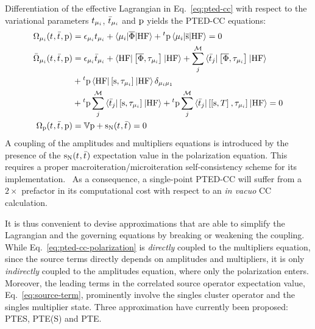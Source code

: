 Differentiation of the effective Lagrangian in Eq.~\eqref{eq:pted-cc}
with respect to the variational parameters $t_{\mu_i}$,
$\bar{t}_{\mu_i}$ and $\mathrm{p}$ yields the \acs{PTED}-\acs{CC}
equations:
\begin{subequations}
  \begin{align}
   \Omega_{\mu_i}(t_{}, \bar{t}_{}, \mathrm{p})  &=
   \epsilon_{\mu_i}t_{\mu_i} + \braket{\mu_i | \overline{\Phi} | \mathrm{HF}}
   + {}^t\mathrm{p}\braket{\mu_i | \overline{\mathrm{s}} | \mathrm{HF}}
             = 0 \label{eq:pted-cc-amplitudes}\\
   \bar{\Omega}_{\mu_i}(t_{}, \bar{t}_{}, \mathrm{p})
    &=
    \epsilon_{\mu_i}\bar{t}_{\mu_i} +
    \braket{\mathrm{HF} | \left[ \overline{\Phi}, \tau_{\mu_i} \right]^{} | \mathrm{HF}} +
    \sum_{j}^{\mathcal{M}}\braket{\bar{t}_{j} |
    \left[ \overline{\Phi}, \tau_{\mu_i} \right]^{} | \mathrm{HF}}
    \nonumber \\
    &+
    {}^t\mathrm{p}\braket{\mathrm{HF} | \left[ \mathrm{s}, \tau_{\mu_i} \right]^{} | \mathrm{HF}}\delta_{\mu_i\mu_1} \nonumber \\
    &+
    {}^t\mathrm{p}\sum_{j}^{\mathcal{M}}\braket{\bar{t}_{j} | \left[ \mathrm{s}, \tau_{\mu_i} \right]^{} | \mathrm{HF}}
    +
    {}^t\mathrm{p}\sum_{j}^{\mathcal{M}}\braket{\bar{t}_{j} | \left[ \left[ \mathrm{s}, T \right]^{}, \tau_{\mu_i} \right]^{} | \mathrm{HF}}
             = 0 \label{eq:pted-cc-multipliers}\\
    \Omega_{\mathrm{p}}(t_{}, \bar{t}_{}, \mathrm{p})
    &=
    \mathbb{V}\mathrm{p} + \mathrm{s}_{\mathrm{N}}(t_{}, \bar{t}_{}) = 0
    \label{eq:pted-cc-polarization}
  \end{align}
\end{subequations}
A coupling of the amplitudes and multipliers equations is introduced by
the presence of the $\mathrm{s}_{\mathrm{N}}(t_{}, \bar{t}_{})$ expectation value
in the polarization equation.
This requires a proper macroiteration/microiteration self-consistency
scheme for its implementation.~\autocite{Cammi2009-gu, Caricato2010-hx}
As a consequence, a single-point \acs{PTED}-\acs{CC} will suffer from a
$2\times$ prefactor in its computational cost with respect to an
\emph{in vacuo} \acs{CC} calculation.

It is thus convenient to devise approximations that are able to simplify the
Lagrangian and the governing equations by breaking or weakening the coupling.
While Eq.~\eqref{eq:pted-cc-polarization} is \emph{directly} coupled to
the multipliers equation, since the source terms directly depends on
amplitudes and multipliers, it is only \emph{indirectly} coupled to the
amplitudes equation, where only the polarization enters.
Moreover, the leading terms in the correlated source operator
expectation value, Eq.~\eqref{eq:source-term}, prominently involve the
singles cluster operator and the singles multiplier state.
Three approximation have currently been proposed: \acs{PTES}, \acs{PTE(S)}
and \acs{PTE}.

